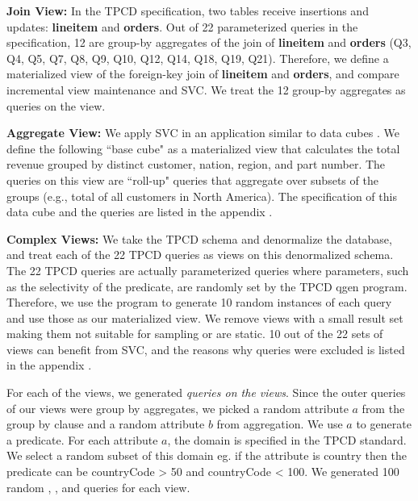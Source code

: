 \textbf{Join View: } In the TPCD specification, two tables receive insertions and updates: \textbf{lineitem} and \textbf{orders}.
Out of 22 parameterized queries in the specification, 12 are group-by aggregates of the join of \textbf{lineitem} and \textbf{orders} (Q3, Q4, Q5, Q7, Q8, Q9, Q10, Q12, Q14, Q18, Q19, Q21).
Therefore, we define a materialized view of the foreign-key join of \textbf{lineitem} and \textbf{orders}, and compare incremental view maintenance and SVC.
We treat the 12 group-by aggregates as queries on the view.

\textbf{Aggregate View: } We apply SVC in an application similar to data cubes \cite{gray1997data}.
We define the following ``base cube" as a materialized view that calculates the total revenue 
grouped by distinct customer, nation, region, and part number.
The queries on this view are ``roll-up" queries that aggregate over 
subsets of the groups (e.g., total of all customers in North America).
The specification of this data cube and the queries are listed in the appendix .

\textbf{Complex Views:} We take the TPCD schema and denormalize the database, and treat each of the 22 
TPCD queries as views on this denormalized schema. 
The 22 TPCD queries are actually parameterized queries where parameters, such as the selectivity of the predicate, are randomly set by the TPCD \textsf{qgen} program.
Therefore, we use the program to generate 10 random instances of each query and use those as our materialized view.
We remove views with a small result set making them not suitable for sampling or are static.
10 out of the 22 sets of views can benefit from SVC, and the reasons why queries were excluded is listed in the appendix .

For each of the views, we generated \emph{queries on the views}.
Since the outer queries of our views were group by aggregates, we picked a random attribute $a$ from the group by clause and a random attribute $b$ from aggregation.
We use $a$ to generate a predicate.
For each attribute $a$, the domain is specified in the TPCD standard.
We select a random subset of this domain eg. if the attribute is country then the predicate can be \textsf{countryCode} > 50 and \textsf{countryCode} < 100.
We generated 100 random \sumfunc, \avgfunc, and \countfunc queries for each view.

